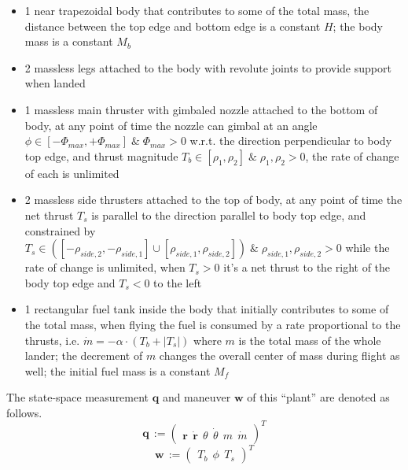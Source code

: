 \documentclass[notitlepage,twocolumn,10pt]{article}
\begin{document}
\begin{itemize}
    \item 1 near trapezoidal body that contributes to some of the total mass, the distance between the top edge and bottom edge is a constant $H$; the body mass is a constant $M_{b}$
    \item 2 massless legs attached to the body with revolute joints to provide support when landed
    \item 1 massless main thruster with gimbaled nozzle attached to the bottom of body, at any point of time the nozzle can gimbal at an angle $\phi \in [-\Phi_{max}, +\Phi_{max}] \; \& \; \Phi_{max} > 0$ w.r.t. the direction perpendicular to body top edge, and thrust magnitude $T_{b} \in [\rho_1, \rho_2] \; \& \; \rho_1, \rho_2 > 0$, the rate of change of each is unlimited
    \item 2 massless side thrusters attached to the top of body, at any point of time the net thrust $T_{s}$ is parallel to the direction parallel to body top edge, and constrained by $T_{s} \in ([-\rho_{side, 2}, -\rho_{side, 1}] \cup [\rho_{side, 1}, \rho_{side, 2}]) \; \& \; \rho_{side, 1} , \rho_{side, 2} > 0$ while the rate of change is unlimited, when $T_{s} > 0$ it's a net thrust to the right of the body top edge and $T_{s} < 0$ to the left
    \item 1 rectangular fuel tank inside the body that initially contributes to some of the total mass, when flying the fuel is consumed by a rate proportional to the thrusts, i.e. $\dot{m} = -\alpha \cdot (T_{b} + |T_{s}|)$ where $m$ is the total mass of the whole lander; the decrement of $m$ changes the overall center of mass during flight as well; the initial fuel mass is a constant $M_{f}$
\end{itemize}

The state-space measurement $\mathbf{q}$ and maneuver $\mathbf{w}$ of this ``plant'' are denoted as follows.
\begin{equation} \label{eqs:state}
\mathbf{q} \, := \left( \begin{matrix} \mathbf{r} \;\, \dot{\mathbf{r}} \;\, \theta \;\, \dot{\theta} \;\, m \;\, \dot{m} \end{matrix} \right)^T
\end{equation}
\begin{equation} \label{eqs:maneuver}
\mathbf{w} \, := \left( \begin{matrix} T_{b} \;\, \phi \;\, T_{s} \end{matrix} \right)^T
\end{equation}
\end{document}
